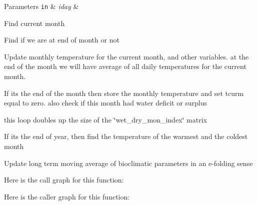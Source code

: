 \begin{DoxyParams}[1]{Parameters}
\mbox{\tt in}  & {\em iday} & \\
\hline
\end{DoxyParams}
Find current month

Find if we are at end of month or not

Update monthly temperature for the current month, and other variables. at the end of the month we will have average of all daily temperatures for the current month.

If its the end of the month then store the monthly temperature and set tcurm equal to zero. also check if this month had water deficit or surplus

this loop doubles up the size of the \char`\"{}wet\+\_\+dry\+\_\+mon\+\_\+index\char`\"{} matrix

If its the end of year, then find the temperature of the warmest and the coldest month

Update long term moving average of bioclimatic parameters in an e-\/folding sense 

Here is the call graph for this function\+:




Here is the caller graph for this function\+:


